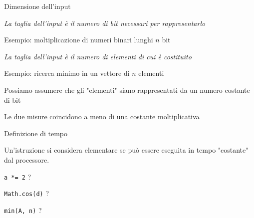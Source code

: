 \begin{frame}[shrink=5]{Dimensione dell'input}

\vspace{-9pt}
\begin{myboxtitle}
\BI
\item \emph{La taglia dell'input è il numero di bit necessari per rappresentarlo}
\item Esempio: moltiplicazione di numeri binari lunghi $n$ bit
\EI
\end{myboxtitle}

\begin{myboxtitle}
\BI
\item \emph{La taglia dell'input è il numero di elementi di cui è costituito}
\item Esempio: ricerca minimo in un vettore di $n$ elementi
\EI
\end{myboxtitle}

\begin{myboxtitle}
\BI
\item Possiamo assumere che gli "elementi" siano rappresentati da un numero costante di bit
\item Le due misure coincidono a meno di una costante moltiplicativa
\EI
\end{myboxtitle}

\end{frame}

\begin{frame}{Definizione di tempo}

\vspace{-9pt}
\begin{myboxtitle}
Un'istruzione si considera elementare se può essere eseguita in tempo "costante"
dal processore.
\end{myboxtitle}

\begin{myboxtitle}
\BI
\item \texttt{a *= 2} ?
\item \texttt{Math.cos(d)} ?
\item \texttt{min(A, n)} ?
\EI
\end{myboxtitle}


\end{frame}

